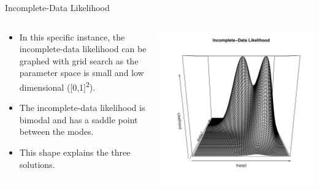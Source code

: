 \documentclass[dvipdfmx,bigger,aspectratio=169]{beamer}
\begin{document}
\begin{frame}[label={sec:orgae3a4fd}]{Incomplete-Data Likelihood}
\begin{columns}
\begin{column}{0.50\columnwidth}
\begin{itemize}
\item In this specific instance, the incomplete-data likelihood can be graphed with grid search as the parameter space is small and low dimensional ([0,1]\textsuperscript{2}).
\item The incomplete-data likelihood is bimodal and has a saddle point between the modes.
\item This shape explains the three solutions.
\end{itemize}
\end{column}

\begin{column}{0.50\columnwidth}
\scriptsize
\begin{center}
\includegraphics[width=.9\linewidth]{./source/likelihood2.pdf}
\end{center}
\end{column}
\end{columns}
\end{frame}
\end{document}
